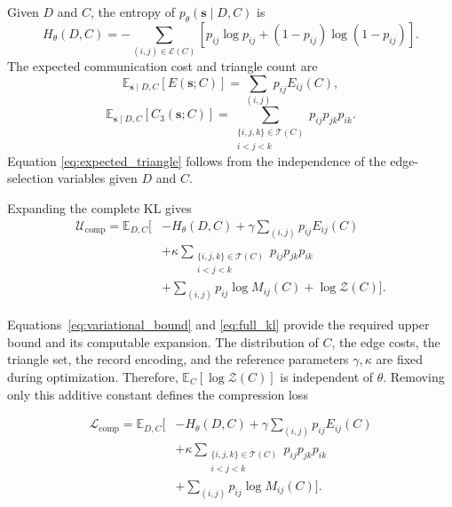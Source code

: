 Given $D$ and $C$, the entropy of $p_\theta(\mathbf s\mid D,C)$ is
\begin{equation}
    H_\theta(D,C)
    =
    -\sum_{(i, j)\in\mathcal E(C)}
    \left[
    p_{ij}\log p_{ij}
    +(1-p_{ij})\log(1-p_{ij})
    \right].
    \label{eq:entropy_of_p_theta}
\end{equation}
The expected communication cost and triangle count are
\begin{equation}
    \mathbb E_{\mathbf s\mid D,C}[E(\mathbf s;C)]
    =
    \sum_{(i, j)}p_{ij}E_{ij}(C),
    \label{eq:expected_energy}
\end{equation}
\begin{equation}
    \mathbb E_{\mathbf s\mid D,C}[C_3(\mathbf s;C)]
    =
    \sum_{\substack{\{i,j,k\}\in\mathcal T(C)\\i<j<k}}
    p_{ij}p_{jk}p_{ik}.
    \label{eq:expected_triangle}
\end{equation}
Equation \eqref{eq:expected_triangle} follows from the independence of the edge-selection variables given $D$ and $C$.

Expanding the complete KL gives
\begin{equation}
    \begin{aligned}
    \mathcal U_{\mathrm{comp}}
    =
    \mathbb E_{D,C}\Bigg[
    &-H_\theta(D,C)
    +\gamma\sum_{(i, j)}p_{ij}E_{ij}(C)\\
    &+\kappa
    \sum_{\substack{\{i,j,k\}\in\mathcal T(C)\\i<j<k}}
    p_{ij}p_{jk}p_{ik}\\
    &+\sum_{(i, j)}p_{ij}\log M_{ij}(C)
    +\log\mathcal Z(C)
    \Bigg].
    \end{aligned}
    \label{eq:full_kl}
\end{equation}

Equations~\eqref{eq:variational_bound} and \eqref{eq:full_kl} provide the required upper bound and its computable expansion. The distribution of $C$, the edge costs, the triangle set, the record encoding, and the reference parameters $\gamma,\kappa$ are fixed during optimization. Therefore, $\mathbb E_C[\log\mathcal Z(C)]$ is independent of $\theta$. Removing only this additive constant defines the compression loss

\begin{equation}
    \begin{aligned}
    \mathcal L_{\mathrm{comp}}
    =
    \mathbb E_{D,C}\Bigg[
    &-H_\theta(D,C)
    +\gamma\sum_{(i, j)}p_{ij}E_{ij}(C)\\
    &+\kappa
    \sum_{\substack{\{i,j,k\}\in\mathcal T(C)\\i<j<k}}
    p_{ij}p_{jk}p_{ik}\\
    &+\sum_{(i, j)}p_{ij}\log M_{ij}(C)
    \Bigg].
    \end{aligned}
    \label{eq:compression_loss}
\end{equation}

